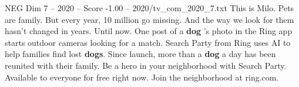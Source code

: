\begin{textsample}{NEG Dim 7 – 2020 – Score -1.00 – 2020/tv\_com\_2020\_7.txt}  \label{ex:f7_neg_003}
This is Milo.
Pets are family.
But every year, 10 million go missing.
And the way we look for them hasn't changed in years.
Until now.
One post of a \textbf{dog} 's photo in the Ring app starts outdoor cameras looking for a match.
Search Party from Ring uses AI to help families find lost \textbf{dogs}.
Since launch, more than a \textbf{dog} a day has been reunited with their family.
Be a hero in your neighborhood with Search Party.
Available to everyone for free right now.
Join the neighborhood at ring.com.

\end{textsample}
